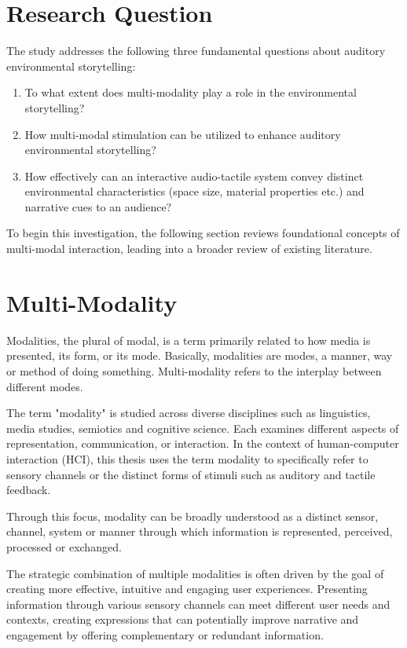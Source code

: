     \section{Research Question} 
        The study addresses the following three fundamental questions about auditory environmental storytelling:
        \begin{enumerate}
            \item To what extent does multi-modality play a role in the environmental storytelling?
            \item How multi-modal stimulation can be utilized to enhance auditory environmental storytelling?
            \item How effectively can an interactive audio-tactile system convey distinct environmental characteristics (space size, material properties etc.) and narrative cues to an audience?
        \end{enumerate}
        To begin this investigation, the following section reviews foundational concepts of multi-modal interaction, leading into a broader review of existing literature.
        \section{Multi-Modality} 
        Modalities, the plural of modal, is a term primarily related to how media is presented, its form, or its mode. Basically, modalities are modes, a manner, way or method of doing something. Multi-modality refers to the interplay between different modes\cite{Multimodal_Discourse}.\par 

        The term "modality" is studied across diverse disciplines such as linguistics, media studies, semiotics and cognitive science. Each examines different aspects of representation, communication, or interaction. In the context of human-computer interaction (HCI), this thesis uses the term modality to specifically refer to sensory channels or the distinct forms of stimuli such as auditory and tactile feedback.\par

        Through this focus, modality can be broadly understood as a distinct sensor, channel, system or manner through which information is represented, perceived, processed or exchanged.\par

        The strategic combination of multiple modalities is often driven by the goal of creating more effective, intuitive and engaging user experiences. Presenting information through various sensory channels can meet different user needs and contexts, creating expressions that can potentially improve narrative and engagement by offering complementary or redundant information.\par


